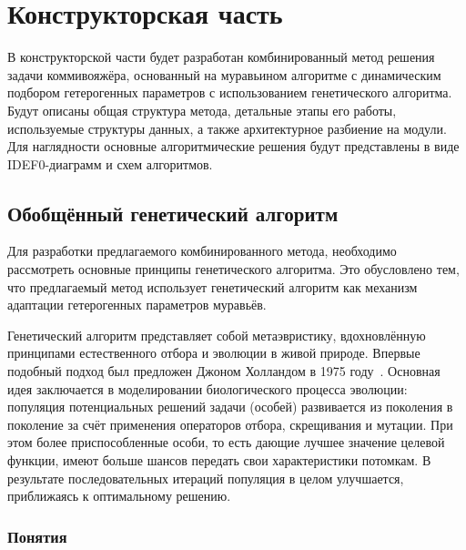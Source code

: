 \chapter{Конструкторская часть}

В конструкторской части будет разработан комбинированный метод решения задачи коммивояжёра, основанный на муравьином алгоритме с динамическим подбором гетерогенных параметров с использованием генетического алгоритма. Будут описаны общая структура метода, детальные этапы его работы, используемые структуры данных, а также архитектурное разбиение на модули. Для наглядности основные алгоритмические решения будут представлены в виде IDEF0-диаграмм и схем алгоритмов.

\section{Обобщённый генетический алгоритм}

Для разработки предлагаемого комбинированного метода, необходимо рассмотреть основные принципы генетического алгоритма. Это обусловлено тем, что предлагаемый метод использует генетический алгоритм как механизм адаптации гетерогенных параметров муравьёв.

Генетический алгоритм представляет собой метаэвристику, вдохновлённую принципами естественного отбора и эволюции в живой природе. Впервые подобный подход был предложен Джоном Холландом в 1975 году~\cite{genetic}. Основная идея заключается в моделировании биологического процесса эволюции: популяция потенциальных решений задачи (особей) развивается из поколения в поколение за счёт применения операторов отбора, скрещивания и мутации. При этом более приспособленные особи, то есть дающие лучшее значение целевой функции, имеют больше шансов передать свои характеристики потомкам. В результате последовательных итераций популяция в целом улучшается, приближаясь к оптимальному решению.

\subsection{Понятия}

